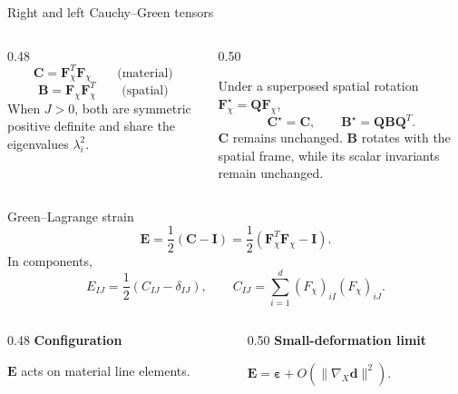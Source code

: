 \documentclass[aspectratio=169,11pt]{beamer}
\newcommand{\I}{\bm{I}}
\newcommand{\Fdef}{\bm{F}_{\chi}}
\newcommand{\Cten}{\bm{C}}
\newcommand{\Bten}{\bm{B}}
\newcommand{\Eten}{\bm{E}}
\newcommand{\gradX}{\nabla_{\!X}}
\begin{document}
\begin{frame}{Right and left Cauchy--Green tensors}
\begin{columns}[T,onlytextwidth]
\begin{column}{0.48\textwidth}
\[
  \Cten=\Fdef^T\Fdef
  \qquad\text{(material)}
\]
\[
  \Bten=\Fdef\Fdef^T
  \qquad\text{(spatial)}
\]
When \(J>0\), both are symmetric positive definite and share the eigenvalues \(\lambda_i^2\).
\end{column}
\begin{column}{0.50\textwidth}
\begin{punchbox}
\small
Under a superposed spatial rotation
\(\Fdef^\star=\bm{Q}\Fdef\),
\[
  \Cten^\star=\Cten,
  \qquad
  \Bten^\star=\bm{Q}\Bten\bm{Q}^T.
\]
\(\Cten\) remains unchanged. \(\Bten\) rotates with the spatial frame, while its scalar invariants remain unchanged.
\end{punchbox}
\end{column}
\end{columns}
\end{frame}

\begin{frame}{Green--Lagrange strain}
\[
  \boxed{
  \Eten
  =\frac12(\Cten-\I)
  =\frac12(\Fdef^T\Fdef-\I)
  }.
\]
In components,
\[
  E_{IJ}
  =
  \frac12(C_{IJ}-\delta_{IJ}),
  \qquad
  C_{IJ}
  =
  \sum_{i=1}^{d}(F_\chi)_{iI}(F_\chi)_{iJ}.
\]
\begin{columns}[T,onlytextwidth]
\begin{column}{0.48\textwidth}
\textbf{Configuration}

\(\Eten\) acts on material line elements.
\end{column}
\begin{column}{0.50\textwidth}
\textbf{Small-deformation limit}

\(\Eten=\bm{\varepsilon}+O(\lVert\gradX\bm{d}\rVert^2)\).
\end{column}
\end{columns}
\end{frame}
\end{document}
